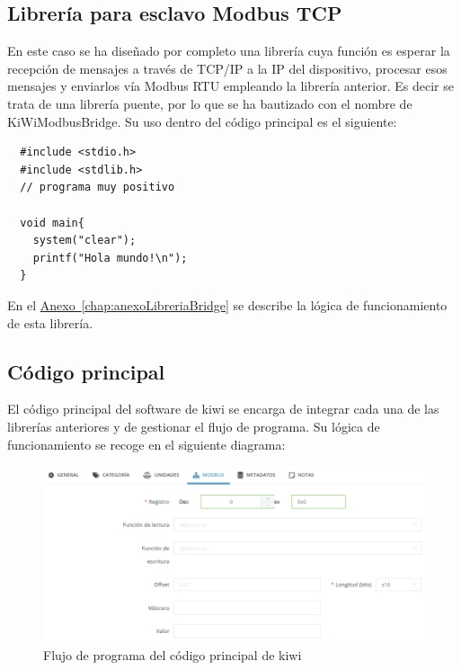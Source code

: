 \subsection{Librería para esclavo Modbus TCP}
\label{subsec:esclavoTCPkiwi}

En este caso se ha diseñado por completo una librería cuya función es esperar la recepción de mensajes a través de TCP/IP a la IP del dispositivo, procesar esos mensajes y enviarlos vía Modbus RTU empleando la librería anterior. Es decir se trata de una librería puente, por lo que se ha bautizado con el nombre de KiWiModbusBridge. Su uso dentro del código principal es el siguiente:

\begin{lstlisting}
  #include <stdio.h>
  #include <stdlib.h>
  // programa muy positivo
  
  void main{
    system("clear");
    printf("Hola mundo!\n");
  }
\end{lstlisting}

En el \hyperref[chap:anexoLibreriaBridge]{Anexo~\ref{chap:anexoLibreriaBridge}} se describe la lógica de funcionamiento de esta librería.

\subsection{Código principal}
\label{subsec:mainCodeKiwi}

El código principal del software de kiwi se encarga de integrar cada una de las librerías anteriores y de gestionar el flujo de programa. Su lógica de funcionamiento se recoge en el siguiente diagrama:

\begin{figure}[H]
  \centering
  \includegraphics[width=\textwidth, keepaspectratio]{img/lib3}
  \caption{Flujo de programa del código principal de kiwi}
  \label{figura:lib6}
\end{figure}